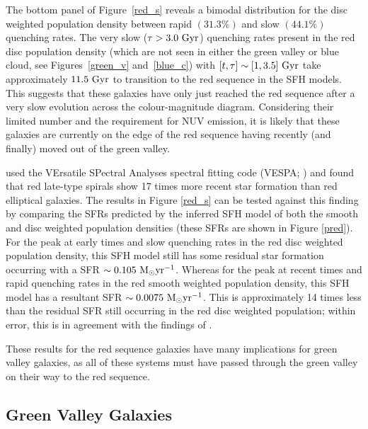 The bottom panel of Figure~\ref{red_s} reveals a bimodal distribution for the disc weighted population density between rapid $(31.3\%)$ and slow $(44.1\%)$ quenching rates. The very slow ($\tau > 3.0 ~\rm{Gyr}$) quenching rates present in the red disc population density (which are not seen in either the green valley or blue cloud, see Figures~\ref{green_v} and~\ref{blue_c}) with $[t, \tau] \sim [1, 3.5]~\rm{Gyr}$ take approximately $11.5~\rm{Gyr}$ to transition to the red sequence in the SFH models. This suggests that these galaxies have only just reached the red sequence after a very slow evolution across the colour-magnitude diagram. Considering their limited number and the requirement for NUV emission, it is likely that these galaxies are currently on the edge of the red sequence having recently (and finally) moved out of the green valley. 

\citet{tojeiro13} used the VErsatile SPectral Analyses spectral fitting code (VESPA; \citealt{tojeiro07}) and found that red late-type spirals show 17 times more recent star formation than red elliptical galaxies. The results in Figure \ref{red_s} can be tested against this finding  by comparing the SFRs predicted by the inferred SFH model of both the smooth and disc weighted population densities (these SFRs are shown in Figure \ref{pred}). For the peak at early times and slow quenching rates in the red disc weighted population density, this SFH model still has some residual star formation occurring with a SFR$~\sim0.105~\rm{M}_{\odot}yr^{-1}$. Whereas for the peak at recent times and rapid quenching rates in the red smooth weighted population density, this SFH model has a resultant SFR$~\sim0.0075~\rm{M}_{\odot}yr^{-1}$. This is approximately 14 times less than the residual SFR still occurring in the red disc weighted population; within error, this is in agreement with the findings of \citet{tojeiro13}. 

These results for the red sequence galaxies have many implications for green valley galaxies, as all of these systems must have passed through the green valley on their way to the red sequence.


\subsection{Green Valley Galaxies}\label{gv}

